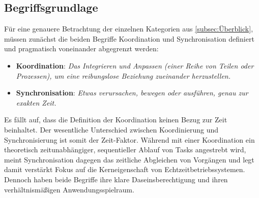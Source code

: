 \documentclass{llncs}
\begin{document}
\subsection{Begriffsgrundlage}
\label{subsec:Begriffsgrundlage}
Für eine genauere Betrachtung der einzelnen Kategorien aus \ref{subsec:Überblick}, müssen zunächst die beiden Begriffe Koordination und Synchronisation definiert und pragmatisch voneinander abgegrenzt werden:
\begin{itemize}
	\setlength\itemsep{1em} %
	\item \textbf{Koordination}: \textit{\glqq Das Integrieren und Anpassen (einer Reihe von Teilen oder Prozessen), um eine reibungslose Beziehung zueinander herzustellen.\grqq} \autocite[vgl.][80]{Cooling2017}
	\item \textbf{Synchronisation}: \textit{\glqq Etwas verursachen, bewegen oder ausführen, genau zur exakten Zeit.\grqq} \autocite[vgl.][80]{Cooling2017}
\end{itemize}
Es fällt auf, dass die Definition der Koordination keinen Bezug zur Zeit beinhaltet. Der wesentliche Unterschied zwischen Koordinierung und Synchronisierung ist somit der Zeit-Faktor. Während mit einer Koordination ein theoretisch zeitunabhängiger, sequentieller Ablauf von Tasks angestrebt wird, meint Synchronisation dagegen das zeitliche Abgleichen von Vorgängen und legt damit verstärkt Fokus auf die Kerneigenschaft von Echtzeitbetriebssystemen. Dennoch haben beide Begriffe ihre klare Daseinsberechtigung und ihren verhältnismäßigen Anwendungsspielraum.
\end{document}
